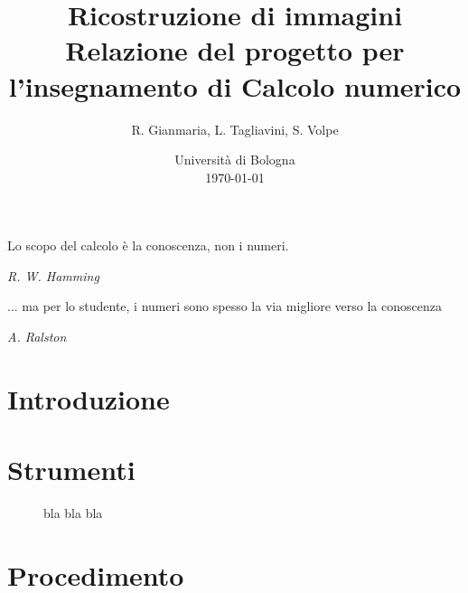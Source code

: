 \documentclass[a4paper]{article}
\title{Ricostruzione di immagini \\ \large Relazione del progetto per l'insegnamento di Calcolo numerico}
\author{
  R. Gianmaria,
  L. Tagliavini,
  S. Volpe
}
\date{
	Universit\`a di Bologna \\
  \today
}
\begin{document}
\maketitle
\thispagestyle{empty}

\epigraph{Lo scopo del calcolo è la conoscenza, non i numeri.}
{\textit{R. W. Hamming}}
\epigraph{... ma per lo studente, i numeri sono spesso la via migliore verso la
conoscenza}
{\textit{A. Ralston}}

\section{Introduzione}


\section{Strumenti}

\begin{figure}
    \begin{center}
        \scalebox{0.65}{}
    \end{center}
    \caption{bla bla bla}
\end{figure}

\section{Procedimento}

\end{document}
